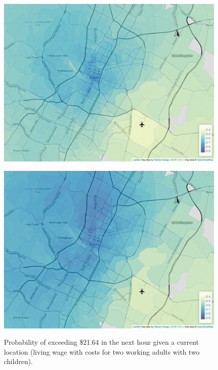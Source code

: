 \documentclass[11pt]{article}
\begin{document}
\begin{figure}[htb]
\begin{minipage}[t]{0.48\linewidth}
        \label{fig:wages:b}
    \end{minipage}\hfill
    \begin{minipage}[t]{.48\linewidth}
        \centering
        \includegraphics[width=\linewidth]{img/tailprob_21_64__142.png}
        \label{fig:wages:c}
    \end{minipage}
    \begin{minipage}[t]{0.48\linewidth}
        \centering
        \includegraphics[width=\linewidth]{img/tailprob_21_64__168.png}
        \label{fig:wages:d}
    \end{minipage}
    \caption{Probability of exceeding \$21.64 in the next hour given a current location (living wage with costs for two working adults with two children).}
    \label{fig:wages}
\end{figure}
\end{document}
